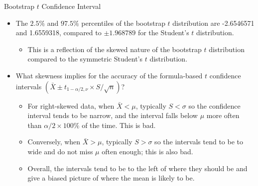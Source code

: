 \documentclass[
  ignorenonframetext,
]{beamer}
\providecommand{\tightlist}{%
  \setlength{\itemsep}{0pt}\setlength{\parskip}{0pt}}
\begin{document}
\begin{frame}{Bootstrap \(t\) Confidence Interval}
\protect\hypertarget{bootstrap-t-confidence-interval-8}{}
\begin{itemize}
\item
  The \(2.5\%\) and \(97.5\%\) percentiles of the bootstrap \(t\)
  distribution are -2.6546571 and 1.6559318, compared to \(\pm1.968789\)
  for the Student's \(t\) distribution.

  \begin{itemize}
  \tightlist
  \item
    This is a reflection of the skewed nature of the bootstrap \(t\)
    distribution compared to the symmetric Student's \(t\) distribution.
  \end{itemize}
\item
  What skewness implies for the accuracy of the formula-based \(t\)
  confidence intervals
  \((\bar{X}\pm t_{1-\alpha/2, \nu}\times S/\sqrt{n})\)?

  \begin{itemize}
  \tightlist
  \item
    For right-skewed data, when \(\bar{X}<\mu\), typically \(S< \sigma\)
    so the confidence interval tends to be narrow, and the interval
    falls below \(\mu\) more often than \(\alpha/2\times 100\%\) of the
    time. This is bad.
  \item
    Conversely, when \(\bar{X}>\mu\), typically \(S>\sigma\) so the
    intervals tend to be to wide and do not miss \(\mu\) often enough;
    this is also bad.
  \item
    Overall, the intervals tend to be to the left of where they should
    be and give a biased picture of where the mean is likely to be.
  \end{itemize}
\end{itemize}
\end{frame}
\end{document}
